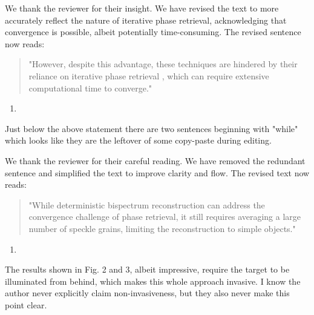 \documentclass[12pt]{article}
\newcommand{\hlred}[1]{\sethlcolor{red!30}\hl{#1}}
\newenvironment{solved_reviewercomment}
    {\begin{tcolorbox}[width=\linewidth,colback=gray!5,colframe=solved_commentcolor!50,title=Reviewer Comment,left=5pt,right=5pt]}
    {\end{tcolorbox}}
\newenvironment{ourresponse}
    {\begin{tcolorbox}[width=\linewidth,breakable,enhanced,colback=gray!5,colframe=responsecolor!50,title=Response,left=5pt,right=5pt]}
    {\end{tcolorbox}}
\begin{document}
\begin{ourresponse}
    We thank the reviewer for their insight. We have revised the text to more accurately reflect the nature of iterative phase retrieval, acknowledging that convergence is possible, albeit potentially time-consuming. The revised sentence now reads:  
    \begin{quote}
        "However, despite this advantage, these techniques are hindered by their reliance on iterative phase retrieval \cite{fienup1978reconstruction}, which can require extensive computational time to converge."
    \end{quote}
    
\end{ourresponse}



\begin{enumerate}[label=\arabic*., resume]
\item \leavevmode
\end{enumerate}
\vspace{-1em}
\begin{solved_reviewercomment}
    Just below the above statement there are two sentences beginning with "while" which looks like they are the leftover of some copy-paste during editing.
\end{solved_reviewercomment}
\begin{ourresponse}
    We thank the reviewer for their careful reading. We have removed the redundant sentence and simplified the text to improve clarity and flow. The revised text now reads:
    \begin{quote}
        "While deterministic bispectrum reconstruction can address the convergence challenge of phase retrieval, it still requires averaging a large number of speckle grains, limiting the reconstruction to simple objects."
    \end{quote}
\end{ourresponse}

        
\begin{enumerate}[label=\arabic*., resume]
\item \leavevmode
\end{enumerate}
\vspace{-1em}
\begin{solved_reviewercomment}
    The results shown in Fig. 2 and 3, albeit impressive, require the target to be illuminated from behind, which makes this whole approach invasive. I know the author never explicitly claim non-invasiveness, but they also never make this point clear.
\end{solved_reviewercomment}
\end{document}
